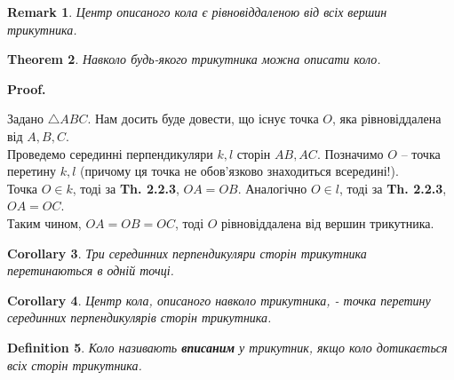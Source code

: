 \documentclass[a4paper, 10pt]{article}
\makeatletter
\def\qed{$\blacksquare$}
\theoremstyle{theoremdd}
\newtheorem{theorem}{Theorem}[subsection]
\theoremstyle{theoremdd}
\theoremstyle{theoremdd}
\newtheorem{definition}[theorem]{Definition}
\theoremstyle{theoremdd}
\theoremstyle{theoremdd}
\theoremstyle{theoremdd}
\theoremstyle{theoremdd}
\newtheorem{remark}[theorem]{Remark}
\theoremstyle{theoremdd}
\theoremstyle{theoremdd}
\newtheorem{corollary}[theorem]{Corollary}
\renewenvironment{proof}[1][Proof.\\]{\par
\pushQED{\hfill \qed}%
\normalfont \topsep6\p@\@plus6\p@\relax
\trivlist
\item\relax
{\bfseries
#1\@addpunct{.}}\hspace\labelsep\ignorespaces
}{%
\popQED\endtrivlist\@endpefalse
}
\makeatother
\begin{document}
\begin{remark}
Центр описаного кола є рівновіддаленою від всіх вершин трикутника.
\end{remark}

\begin{theorem}
Навколо будь-якого трикутника можна описати коло.
\end{theorem}

\begin{proof}
Задано $\triangle ABC$. Нам досить буде довести, що існує точка $O$, яка рівновіддалена від $A,B,C$.\\
Проведемо серединні перпендикуляри $k,l$ сторін $AB,AC$. Позначимо $O$ -- точка перетину $k,l$ (причому ця точка не обов'язково знаходиться всередині!).\\
Точка $O \in k$, тоді за \textbf{Th. 2.2.3}, $OA = OB$. Аналогічно $O \in l$, тоді за \textbf{Th. 2.2.3}, $OA = OC$.\\
Таким чином, $OA = OB = OC$, тоді $O$ рівновіддалена від вершин трикутника.
\begin{figure}[H]
\centering
{}
\end{figure}
\end{proof}

\begin{corollary}
Три серединних перпендикуляри сторін трикутника перетинаються в одній точці.
\end{corollary}

\begin{corollary}
Центр кола, описаного навколо трикутника, - точка перетину серединних перпендикулярів сторін трикутника.
\end{corollary}

\begin{definition}
Коло називають \textbf{вписаним} у трикутник, якщо коло дотикається всіх сторін трикутника.
\begin{figure}[H]
\centering
{}
\end{figure}
\end{definition}
\end{document}

